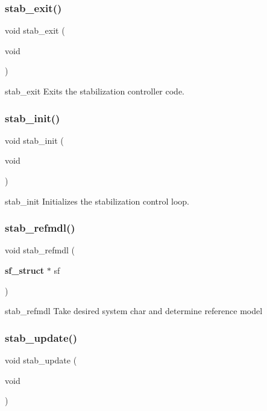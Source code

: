 \subsubsection{stab\+\_\+exit()}
{\footnotesize\ttfamily void stab\+\_\+exit (\begin{DoxyParamCaption}\item[{void}]{ }\end{DoxyParamCaption})}

stab\+\_\+exit Exits the stabilization controller code. \mbox{\label{stab_8h_afebd7080cdd60d2bd10a3b841458a738}} 
\subsubsection{stab\+\_\+init()}
{\footnotesize\ttfamily void stab\+\_\+init (\begin{DoxyParamCaption}\item[{void}]{ }\end{DoxyParamCaption})}

stab\+\_\+init Initializes the stabilization control loop. \mbox{\label{stab_8h_a990546b623a6709713ebe3186da90d3e}} 
\subsubsection{stab\+\_\+refmdl()}
{\footnotesize\ttfamily void stab\+\_\+refmdl (\begin{DoxyParamCaption}\item[{\textbf{ sf\+\_\+struct} $\ast$}]{sf }\end{DoxyParamCaption})}

stab\+\_\+refmdl Take desired system char and determine reference model \mbox{\label{stab_8h_a5ca4701cc9747034af33ba50ffb2bb81}} 
\subsubsection{stab\+\_\+update()}
{\footnotesize\ttfamily void stab\+\_\+update (\begin{DoxyParamCaption}\item[{void}]{ }\end{DoxyParamCaption})}

